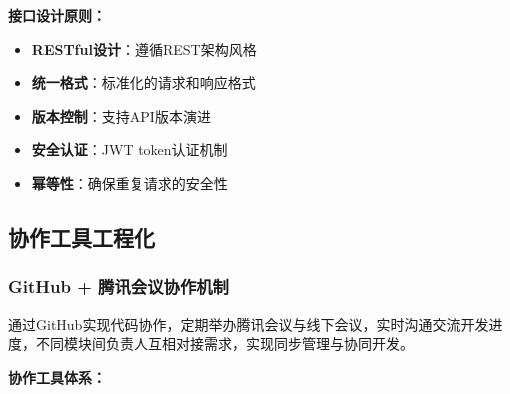 \documentclass[a4paper]{article}
\begin{document}
\textbf{接口设计原则：}
\begin{itemize}
    \item \textbf{RESTful设计}：遵循REST架构风格
    \item \textbf{统一格式}：标准化的请求和响应格式
    \item \textbf{版本控制}：支持API版本演进
    \item \textbf{安全认证}：JWT token认证机制
    \item \textbf{幂等性}：确保重复请求的安全性
\end{itemize}

\subsection{协作工具工程化}

\subsubsection{GitHub + 腾讯会议协作机制}

通过GitHub实现代码协作，定期举办腾讯会议与线下会议，实时沟通交流开发进度，不同模块间负责人互相对接需求，实现同步管理与协同开发。

\textbf{协作工具体系：}
\end{document}
